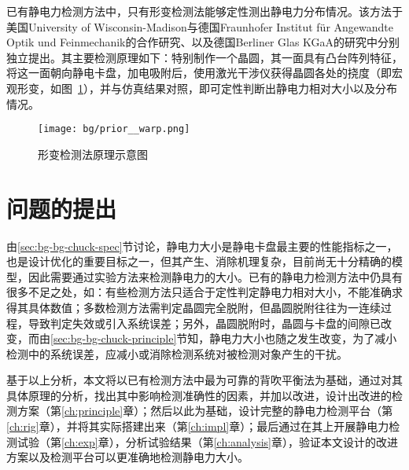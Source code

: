 已有静电力检测方法中，只有形变检测法能够定性测出静电力分布情况。该方法于美国University of Wisconsin-Madison与德国Fraunhofer Institut für Angewandte Optik und Feinmechanik的合作研究、以及德国Berliner Glas KGaA的研究中分别独立提出。其主要检测原理如下：特别制作一个晶圆，其一面具有凸台阵列特征，将这一面朝向静电卡盘，加电吸附后，使用激光干涉仪获得晶圆各处的挠度（即宏观形变，如图~\ref{fig:bg-prior-warp}），并与仿真结果对照，即可定性判断出静电力相对大小以及分布情况。

\begin{figure}[tbh]
\centering
\texttt{[image: bg/prior\_\_warp.png]}
\caption{形变检测法原理示意图}
\label{fig:bg-prior-warp}
\end{figure}



\section{问题的提出}\label{sec:bg-problem}

由\ref{sec:bg-bg-chuck-spec}节讨论，静电力大小是静电卡盘最主要的性能指标之一，也是设计优化的重要目标之一，但其产生、消除机理复杂，目前尚无十分精确的模型，因此需要通过实验方法来检测静电力的大小。已有的静电力检测方法中仍具有很多不足之处，如：有些检测方法只适合于定性判定静电力相对大小，不能准确求得其具体数值；多数检测方法需判定晶圆完全脱附，但晶圆脱附往往为一连续过程，导致判定失效或引入系统误差；另外，晶圆脱附时，晶圆与卡盘的间隙已改变，而由\ref{sec:bg-bg-chuck-principle}节知，静电力大小也随之发生改变，为了减小检测中的系统误差，应减小或消除检测系统对被检测对象产生的干扰。


基于以上分析，本文将以已有检测方法中最为可靠的背吹平衡法为基础，通过对其具体原理的分析，找出其中影响检测准确性的因素，并加以改进，设计出改进的检测方案（第\ref{ch:principle}章）；然后以此为基础，设计完整的静电力检测平台（第\ref{ch:rig}章），并将其实际搭建出来（第\ref{ch:impl}章）；最后通过在其上开展静电力检测试验（第\ref{ch:exp}章），分析试验结果（第\ref{ch:analysis}章），验证本文设计的改进方案以及检测平台可以更准确地检测静电力大小。